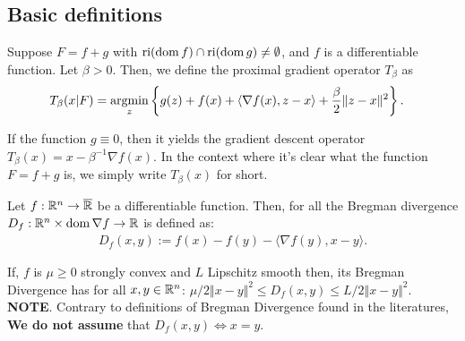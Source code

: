 \documentclass[12pt]{article}
\begin{document}
    \subsection{Basic definitions}
        \begin{definition}\label{def:pg-opt}
            Suppose $F = f + g$ with $\operatorname{ri}(\operatorname{dom} f) \cap \operatorname{ri}(\operatorname{dom} g) \neq \emptyset$, and $f$ is a differentiable function. 
            Let $\beta > 0$. 
            Then, we define the proximal gradient operator $T_{\beta}$ as 
            \begin{align*}
                T_\beta (x | F) &= \mathop{\rm argmin}\limits_{z} \left\lbrace
                    g(z) + f(x) + \langle \nabla f(x), z - x\rangle + \frac{\beta}{2}\Vert z - x\Vert^2
                \right\rbrace. 
            \end{align*}
        \end{definition}
        \begin{remark}
            If the function $g \equiv 0$, then it yields the gradient descent operator $T_\beta(x) = x - \beta^{-1}\nabla f(x)$. 
            In the context where it's clear what the function $F = f + g$ is, we simply write $T_\beta(x)$ for short. 
        \end{remark}
        \begin{definition}
            Let $f:\mathbb R^n \rightarrow \overline {\mathbb R}$ be a differentiable function. 
            Then, for all the Bregman divergence $D_f: \mathbb R^n \times \operatorname{dom}\nabla f \rightarrow \mathbb R$ is defined as: 
            \begin{align*}
                D_f(x, y) := f(x) - f(y) - \langle \nabla f(y), x - y\rangle. 
            \end{align*}
        \end{definition}
        \begin{remark}
            If, $f$ is $\mu \ge 0$ strongly convex and $L$ Lipschitz smooth then, its Bregman Divergence has for all $x, y \in \mathbb R^n$: $\mu/2 \Vert x - y\Vert^2 \le D_f(x, y) \le L/2 \Vert x - y\Vert^2$. 
            \textbf{NOTE}. Contrary to definitions of Bregman Divergence found in the literatures, \textbf{We do not assume} that $D_f(x, y) \iff x = y$. 
        \end{remark}
\end{document}
